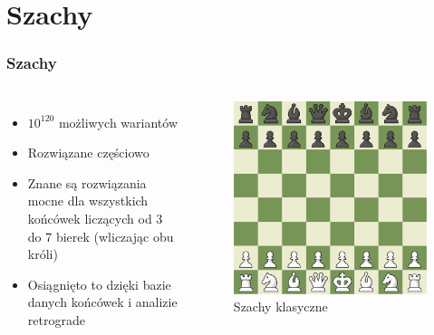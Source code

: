 \documentclass[polish,envcountsect,10pt]{beamer}
\begin{document}
    \section{Szachy}
        \begin{frame}
            \frametitle{Szachy}
            \begin{columns}
            \begin{itemize}
                \item<1-> $10^{120}$ możliwych wariantów
                \item<2-> Rozwiązane częściowo
                \item<3-> Znane są rozwiązania mocne dla wszystkich końcówek liczących od 3 do 7 bierek (wliczając obu króli)
                \item<4-> Osiągnięto to dzięki bazie danych końcówek i analizie retrograde
           \end{itemize}
            \begin{figure}[H]
                \centering
                \includegraphics[width=\textwidth]{images/chess.png}
                \caption{Szachy klasyczne}
            \end{figure}
        \end{columns}
        \end{frame}
\end{document}
